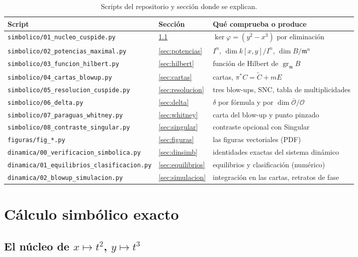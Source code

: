 \documentclass[11pt,a4paper]{article}
\newcommand{\gr}{\operatorname{gr}}
\newcommand{\cO}{\mathcal{O}}
\newcommand{\m}{\mathfrak{m}}
\theoremstyle{plain}
\theoremstyle{definition}
\theoremstyle{remark}
\begin{document}
\begin{table}[ht]
\centering
\small
\begin{tabular}{@{}l l p{6.0cm}@{}}
\toprule
Script & Sección & Qué comprueba o produce \\
\midrule
\texttt{simbolico/01\_nucleo\_cuspide.py} & \ref{sec:nucleo} & $\ker\varphi=(y^2-x^3)$ por eliminación \\
\texttt{simbolico/02\_potencias\_maximal.py} & \ref{sec:potencias} & $I^n$, $\dim k[x,y]/I^n$, $\dim B/\m^n$ \\
\texttt{simbolico/03\_funcion\_hilbert.py} & \ref{sec:hilbert} & función de Hilbert de $\gr_\m B$ \\
\texttt{simbolico/04\_cartas\_blowup.py} & \ref{sec:cartas} & cartas, $\pi^*C=\tilde C+mE$ \\
\texttt{simbolico/05\_resolucion\_cuspide.py} & \ref{sec:resolucion} & tres blow-ups, SNC, tabla de multiplicidades \\
\texttt{simbolico/06\_delta.py} & \ref{sec:delta} & $\delta$ por fórmula y por $\dim\bar{\cO}/\cO$ \\
\texttt{simbolico/07\_paraguas\_whitney.py} & \ref{sec:whitney} & carta del blow-up y punto pinzado \\
\texttt{simbolico/08\_contraste\_singular.py} & \ref{sec:singular} & contraste opcional con Singular \\
\texttt{figuras/fig\_*.py} & \ref{sec:figuras} & las figuras vectoriales (PDF) \\
\texttt{dinamica/00\_verificacion\_simbolica.py} & \ref{sec:dinsimb} & identidades exactas del sistema dinámico \\
\texttt{dinamica/01\_equilibrios\_clasificacion.py} & \ref{sec:equilibrios} & equilibrios y clasificación (numérico) \\
\texttt{dinamica/02\_blowup\_simulacion.py} & \ref{sec:simulacion} & integración en las cartas, retratos de fase \\
\bottomrule
\end{tabular}
\caption{Scripts del repositorio y sección donde se explican.}
\end{table}

\section{Cálculo simbólico exacto}\label{sec:simbolico}

\subsection{El núcleo de \texorpdfstring{$x\mapsto t^2$, $y\mapsto t^3$}{x a t al cuadrado, y a t al cubo}}\label{sec:nucleo}
\end{document}

